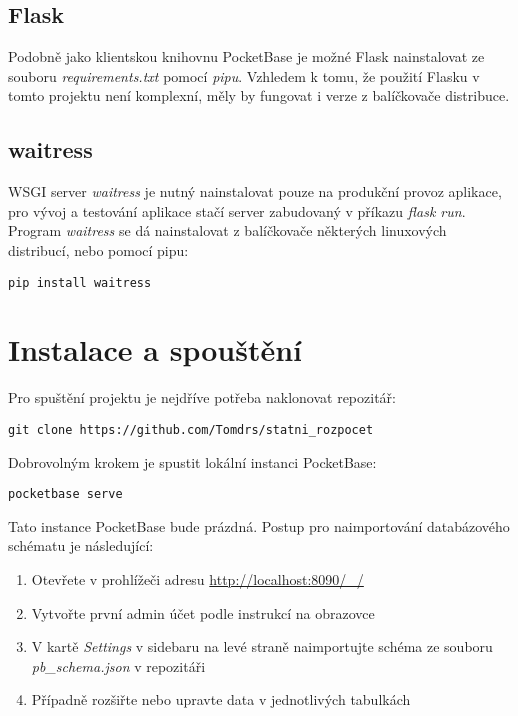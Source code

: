 \documentclass[11pt,a4paper,twoside,openright]{report}
\begin{document}
\subsection{Flask}
Podobně jako klientskou knihovnu PocketBase je možné Flask nainstalovat ze souboru
\emph{requirements.txt} pomocí \emph{pipu}. Vzhledem k tomu, že použití Flasku v tomto
projektu není komplexní, měly by fungovat i verze z balíčkovače distribuce.

\subsection{waitress}
WSGI server \emph{waitress} je nutný nainstalovat pouze na produkční provoz aplikace,
pro vývoj a testování aplikace stačí server zabudovaný v příkazu \emph{flask run}. Program \emph{waitress} se dá nainstalovat z balíčkovače některých linuxových distribucí, nebo pomocí pipu:

\begin{verbatim}
pip install waitress
\end{verbatim}

\section{Instalace a spouštění}
Pro spuštění projektu je nejdříve potřeba naklonovat
repozitář:

\begin{verbatim}
git clone https://github.com/Tomdrs/statni_rozpocet
\end{verbatim}

Dobrovolným krokem je spustit lokální instanci PocketBase:

\begin{verbatim}
pocketbase serve
\end{verbatim}

Tato instance PocketBase bude prázdná. Postup pro naimportování
databázového schématu je následující:

\begin{enumerate}
  \item Otevřete v prohlížeči adresu \url{http://localhost:8090/_/}
  \item Vytvořte první admin účet podle instrukcí na obrazovce
  \item V kartě \emph{Settings} v sidebaru na levé straně naimportujte schéma ze souboru \emph{pb\_schema.json} v repozitáři
  \item Případně rozšiřte nebo upravte data v jednotlivých tabulkách
\end{enumerate}
\end{document}
